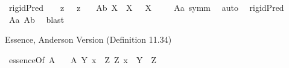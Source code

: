 \begin{isabellebody}
\ {\isachardoublequoteopen}rigidPred\ {\isasymtau}\ {\isasymequiv}\ {\isacharparenleft}{\isasymlambda}{\isasymbeta}{\isachardot}\ \isactrlbold {\isasymbox}{\isacharparenleft}{\isacharparenleft}{\isasymlambda}z{\isachardot}\ {\isasymbeta}\ \isactrlbold {\isasymapprox}\ z{\isacharparenright}\ \isactrlbold {\isasymdown}{\isasymtau}{\isacharparenright}{\isacharparenright}\ \isactrlbold {\isasymdown}{\isasymtau}{\isachardoublequoteclose}\isanewline
\isanewline
{}\isamarkupfalse%
\ A{}b{\isacharcolon}\ {\isachardoublequoteopen}{\isasymlfloor}\isactrlbold {\isasymforall}X{\isachardot}\ \isactrlbold {\isasymnot}{\isacharparenleft}{\isasymP}\ X{\isacharparenright}\ \isactrlbold {\isasymrightarrow}\ \isactrlbold {\isasymbox}\isactrlbold {\isasymnot}{\isacharparenleft}{\isasymP}\ X{\isacharparenright}{\isasymrfloor}{\isachardoublequoteclose}\ \isanewline
%
\isadelimproof
\ \ %
\endisadelimproof
%
\isatagproof
{}\isamarkupfalse%
\ A{}a\ symm\ \isamarkupfalse%
\ auto\ %
%
\endisatagproof
{\isafoldproof}%
%
\isadelimproof
\isanewline
%
\endisadelimproof
{}\isamarkupfalse%
\ {\isachardoublequoteopen}{\isasymlfloor}rigidPred\ {\isasymP}{\isasymrfloor}{\isachardoublequoteclose}\ \isanewline
%
\isadelimproof
\ \ %
\endisadelimproof
%
\isatagproof
{}\isamarkupfalse%
\ A{}a\ A{}b\ \isamarkupfalse%
\ blast\ %
%
\endisatagproof
{\isafoldproof}%
%
\isadelimproof
%
\endisadelimproof
%
\begin{isamarkuptext}%
Essence, Anderson Version (Definition 11.34)%
\end{isamarkuptext}\isamarkuptrue%
\isamarkupfalse%
\ essenceOf{\isacharcolon}{\isacharcolon}{\isachardoublequoteopen}{\isasymup}{\isasymlangle}{\isasymup}{\isasymlangle}{\isasymzero}{\isasymrangle}{\isacharcomma}{\isasymzero}{\isasymrangle}{\isachardoublequoteclose}\ {\isacharparenleft}{\isachardoublequoteopen}{\isasymE}\isactrlsup A{\isachardoublequoteclose}{\isacharparenright}\ \isanewline
\ \ {\isachardoublequoteopen}{\isasymE}\isactrlsup A\ Y\ x\ {\isasymequiv}\ {\isacharparenleft}\isactrlbold {\isasymforall}Z{\isachardot}\ \isactrlbold {\isasymbox}{\isacharparenleft}Z\ x{\isacharparenright}\ \isactrlbold {\isasymleftrightarrow}\ Y\ {\isasymRrightarrow}\ Z{\isacharparenright}{\isachardoublequoteclose}%
\begin{isamarkuptext}%

\end{isamarkuptext}
\end{isabellebody}
